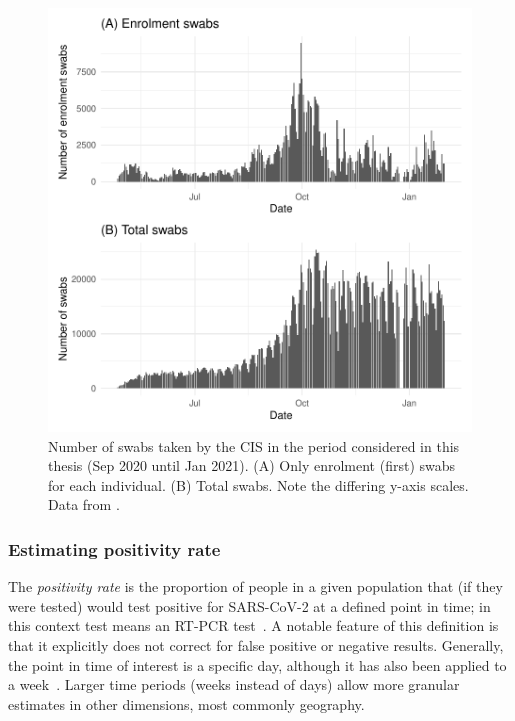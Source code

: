 \documentclass[thesis.tex]{subfiles}
\begin{document}
\begin{figure}
  \centering \includegraphics{biology-data/CIS-recruitment}
  \caption[CIS swab numbers]{%
    Number of swabs taken by the CIS in the period considered in this thesis (Sep 2020 until Jan 2021).
    (A) Only enrolment (\ie first) swabs for each individual.
    (B) Total swabs.
    Note the differing y-axis scales.
    Data from \textcite{CIStechData}.
  }
  \label{biology-data:fig:CIS-recruitment}
\end{figure}


\subsubsection{Estimating positivity rate} \label{biology-data:sec:positivity}

The \emph{positivity rate} is the proportion of people in a given population that (if they were tested) would test positive for SARS-CoV-2 at a defined point in time; in this context test means an RT-PCR test~\autocite{cisMethodsONS}.
A notable feature of this definition is that it explicitly does not correct for false positive or negative results.
Generally, the point in time of interest is a specific day, although it has also been applied to a week~\autocite{cisMethodsONS,pouwelsMRPvaccination,pouwelsCommunity}.
Larger time periods (\ie weeks instead of days) allow more granular estimates in other dimensions, most commonly geography.
\end{document}
